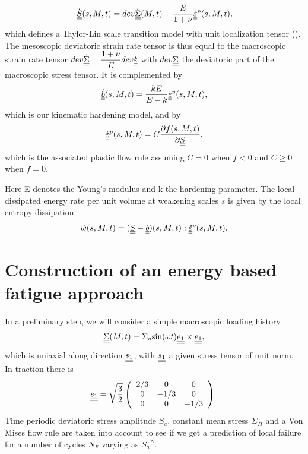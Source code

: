\begin{equation}
\dot{\uline{\uline{S}}}(s,M,t)=dev\dot{\uline{\uline{\Sigma}}}(M,t)-\dfrac{E}{1+\nu}\dot{\uline{\uline{\varepsilon}}}^p(s,M,t), 
\label{eq.mesostress}
\end{equation}
which defines a Taylor-Lin scale transition model with unit localization tensor (\cite{Bosia201239}). The mesoscopic deviatoric strain rate tensor is thus equal to the macroscopic strain rate tensor $dev\dot{\uline{\uline{\Sigma}}}=\dfrac{1+\nu}{E}dev\dot{\uline{\uline{\varepsilon}}}$ with $dev\uline{\uline{\Sigma}}$ the deviatoric part of the macroscopic stress tensor. It is complemented by
\begin{equation}
\dot{\uline{\uline{b}}}(s,M,t)=\dfrac{kE}{E-k} \dot{\uline{\uline{\varepsilon}}}^p(s,M,t), 
\label{eq.backstress}
\end{equation}
which is our kinematic hardening model, and by
\begin{equation}
\dot{\uline{\uline{\varepsilon}}}^p(s,M,t)=C\dfrac{\partial f(s,M,t)}{\partial \uline{\uline{S}}}, 
\label{eq.plasticflow}
\end{equation}
which is the associated plastic flow rule assuming $C=0$ when $f<0$ and  $C\geqslant0$ when $f=0$.

Here E denotes the Young's modulus and k the hardening parameter. The local dissipated energy rate per unit volume at weakening scales $s$  is given by the local entropy dissipation:
\begin{equation}
\dot{w}(s,M,t)=(\uline{\uline{S}}-\uline{\uline{b}})(s,M,t):\uline{\uline{\dot{\varepsilon}}}^p(s,M,t).
\label{dissipated}
\end{equation}

\section{Construction of an energy based fatigue approach}
\label{sec:5.5}
In a preliminary step, we will consider a simple macroscopic loading history 
$$\uline{\uline{\Sigma}}(M, t)=\Sigma_a\textnormal{sin}(\omega t) \uline{\uline{e_1}}\times\uline{\uline{e_1}},$$
 which is uniaxial  along direction $\uline{\uline{s_1}}$, with $\uline{\uline{s_1}}$ a given stress tensor of unit norm. In traction there is 
 $$\uline{\uline{s_1}}=\sqrt{\dfrac{3}{2}}	\left(
 \begin{array}{ccc}
2/3 & 0 & 0\\
 0 & -1/3 & 0\\ 
 0 & 0 & -1/3\\
 \end{array}\right) . $$
  Time periodic deviatoric stress amplitude $S_{a}$, constant mean stress $\Sigma_{H}$ and a Von Mises flow rule are taken into account to see if we get a prediction of local failure for a number of cycles $N_F$ varying as $S_{a}^{-\gamma}.$

